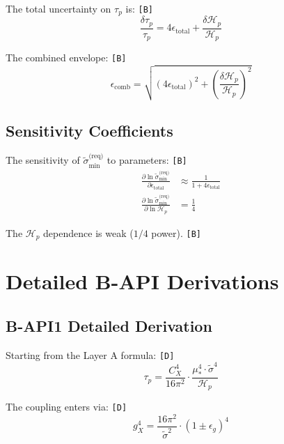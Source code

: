 \documentclass[11pt,a4paper]{article}
\newcommand{\tagD}{\textcolor{green!50!black}{\texttt{[D]}}}
\newcommand{\tagB}{\textcolor{purple!70!black}{\texttt{[B]}}}
\theoremstyle{definition}
\begin{document}
The total uncertainty on $\tau_p$ is: \tagB{}
\begin{equation}
\label{eq:unc-prop-1}
\frac{\delta\tau_p}{\tau_p} = 4\epsilon_{\text{total}} + \frac{\delta\mathcal{H}_p}{\mathcal{H}_p}
\end{equation}

The combined envelope: \tagB{}
\begin{equation}
\label{eq:unc-combined}
\epsilon_{\text{comb}} = \sqrt{(4\epsilon_{\text{total}})^2 + \left(\frac{\delta\mathcal{H}_p}{\mathcal{H}_p}\right)^2}
\end{equation}

\subsection{Sensitivity Coefficients}
\label{subsec:sensitivity}

The sensitivity of $\tilde{\sigma}_{\min}^{\text{(req)}}$ to parameters: \tagB{}
\begin{align}
\label{eq:sens-eps}
\frac{\partial \ln\tilde{\sigma}_{\min}^{\text{(req)}}}{\partial \epsilon_{\text{total}}} &\approx \frac{1}{1 + 4\epsilon_{\text{total}}} \\
\label{eq:sens-hp}
\frac{\partial \ln\tilde{\sigma}_{\min}^{\text{(req)}}}{\partial \ln\mathcal{H}_p} &= \frac{1}{4}
\end{align}

The $\mathcal{H}_p$ dependence is weak ($1/4$ power). \tagB{}

\section{Detailed B-API Derivations}
\label{sec:b-api-detail}

\subsection{B-API1 Detailed Derivation}
\label{subsec:b-api1-detail}

Starting from the Layer A formula: \tagD{}
\begin{equation}
\label{eq:api1-start}
\tau_p = \frac{C_X^4}{16\pi^2} \cdot \frac{\mu_*^4 \cdot \tilde{\sigma}^4}{\mathcal{H}_p}
\end{equation}

The coupling enters via: \tagD{}
\begin{equation}
\label{eq:api1-coupling}
g_X^4 = \frac{16\pi^2}{\tilde{\sigma}^2} \cdot (1 \pm \epsilon_g)^4
\end{equation}
\end{document}
